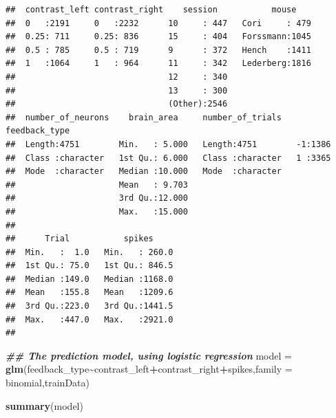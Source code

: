 \documentclass[
]{article}
\newenvironment{Shaded}{\begin{snugshade}}{\end{snugshade}}
\newcommand{\AttributeTok}[1]{\textcolor[rgb]{0.13,0.29,0.53}{#1}}
\newcommand{\DocumentationTok}[1]{\textcolor[rgb]{0.56,0.35,0.01}{\textbf{\textit{#1}}}}
\newcommand{\FunctionTok}[1]{\textcolor[rgb]{0.13,0.29,0.53}{\textbf{#1}}}
\newcommand{\NormalTok}[1]{#1}
\newcommand{\OtherTok}[1]{\textcolor[rgb]{0.56,0.35,0.01}{#1}}
\newcommand{\SpecialCharTok}[1]{\textcolor[rgb]{0.81,0.36,0.00}{\textbf{#1}}}
\newcommand{\StringTok}[1]{\textcolor[rgb]{0.31,0.60,0.02}{#1}}
\begin{document}
\begin{verbatim}
##  contrast_left contrast_right    session           mouse     
##  0   :2191     0   :2232      10     : 447   Cori     : 479  
##  0.25: 711     0.25: 836      15     : 404   Forssmann:1045  
##  0.5 : 785     0.5 : 719      9      : 372   Hench    :1411  
##  1   :1064     1   : 964      11     : 342   Lederberg:1816  
##                               12     : 340                   
##                               13     : 300                   
##                               (Other):2546                   
##  number_of_neurons    brain_area     number_of_trials   feedback_type
##  Length:4751        Min.   : 5.000   Length:4751        -1:1386      
##  Class :character   1st Qu.: 6.000   Class :character   1 :3365      
##  Mode  :character   Median :10.000   Mode  :character                
##                     Mean   : 9.703                                   
##                     3rd Qu.:12.000                                   
##                     Max.   :15.000                                   
##                                                                      
##      Trial           spikes      
##  Min.   :  1.0   Min.   : 260.0  
##  1st Qu.: 75.0   1st Qu.: 846.5  
##  Median :149.0   Median :1168.0  
##  Mean   :155.8   Mean   :1209.6  
##  3rd Qu.:223.0   3rd Qu.:1441.5  
##  Max.   :447.0   Max.   :2921.0  
## 
\end{verbatim}

\begin{Shaded}
\begin{Highlighting}[]
\DocumentationTok{\#\# The prediction model, using logistic regression}
\NormalTok{model }\OtherTok{=} \FunctionTok{glm}\NormalTok{(feedback\_type}\SpecialCharTok{\textasciitilde{}}\NormalTok{contrast\_left}\SpecialCharTok{+}\NormalTok{contrast\_right}\SpecialCharTok{+}\NormalTok{spikes,}\AttributeTok{family =} \StringTok{\textquotesingle{}binomial\textquotesingle{}}\NormalTok{,trainData)}


\FunctionTok{summary}\NormalTok{(model)}
\end{Highlighting}
\end{Shaded}
\end{document}
